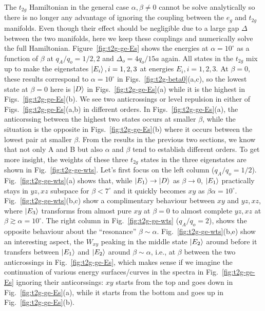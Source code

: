 \documentclass[a4paper,prb,twocolumn]{revtex4-1}  %
\newcommand{\az}[1]{{\color{magenta}{#1}}} %
\begin{document}
The $t_{2g}$ Hamiltonian in the general case $\alpha,\beta\neq 0$ cannot be solve analytically
 so there is no longer any advantage of ignoring the coupling between 
 the $e_{g}$ and $t_{2g}$ manifolds.
Even though their effect should be negligible due to a large gap $\Delta$ between the two manifolds,
here we keep these couplings 
and numerically solve
the full Hamiltonian.
Figure~\ref{fig:t2g-ge-Es}
shows the energies at $\alpha=10^\circ$
as a function of $\beta$
at $q_A/q_o=1/2,2$ and $\Delta_o=4q_o/15a$ again.
All states in the $t_{2g}$ mix up to make the eigenstates $\ket{E_i}, i=1,2,3$
at energies $E_i, i=1,2,3$.
\az{E0, can we show E0 only in the first fig and not all of them?}
At $\beta=0$, these results correspond to $\alpha=10^\circ$ 
in Figs.~\ref{fig:t2g-beta0}(a,c),
so the lowest state at $\beta=0$
here is $\ket{D}$ in Figs.~\ref{fig:t2g-ge-Es}(a)
while it is the highest in Figs.~\ref{fig:t2g-ge-Es}(b).
We see two anticrossings or level repulsion in either of Figs.~\ref{fig:t2g-ge-Es}(a,b)
in different orders.
In Figs.~\ref{fig:t2g-ge-Es}(a), 
the anticorssing between the highest two states occurs at smaller $\beta$,
while the situation is the opposite in Figs.~\ref{fig:t2g-ge-Es}(b) where 
it occurs between the lowest pair at smaller $\beta$.
From the results in the previous two sections,
we know that not only A and B but also $\alpha$ and $\beta$ tend to establish different orders.
To get more insight, the weights of these three $t_{2g}$ states in the three eigenstates 
are shown in Fig.~\ref{fig:t2g-ge-wts}.
Let's first focus on the left column ($q_A/q_o=1/2$). 
Fig.~\ref{fig:t2g-ge-wts}(a)
shows that, while $\ket{E_1}\to \ket{D}$ as $\beta\to 0$,
$\ket{E_1}$ practically stays in $yz,xz$ subspace
for $\beta<7^\circ$ and it quickly becomes $xy$
as $\beta\alpha=10^\circ$.
Fig.~\ref{fig:t2g-ge-wts}(b,c)
show a complimentary behaviour 
between $xy$ and $yz,xz$,
where $\ket{E_3}$
transforms from almost pure $xy$ at $\beta=0$
to almost complete $yz,xz$ at $\beta\gtrsim\alpha=10^\circ$.
The right column
in Fig.~\ref{fig:t2g-ge-wts} ($q_A/q_o=2$),
shows the opposite behaviour 
about the ``resonance'' $\beta\sim\alpha$.
Fig.~\ref{fig:t2g-ge-wts}(b,e)
show an interesting aspect,
the $W_{xy}$ peaking in the middle state $\ket{E_2}$
around before it transfers between $\ket{E_1}$ and $\ket{E_2}$
around $\beta\sim\alpha$,
i.e., at $\beta$
between the two anticrossings in 
Fig.~\ref{fig:t2g-ge-Es},
which makes sense if we imagine the continuation of various energy surfaces/curves
in 
the spectra in Fig.~\ref{fig:t2g-ge-Es}
ignoring their anticorssings:
$xy$ starts from the top and goes down in 
Fig.~\ref{fig:t2g-ge-Es}(a),
while it starts from the bottom and goes up
in Fig.~\ref{fig:t2g-ge-Es}(b).
\end{document}
